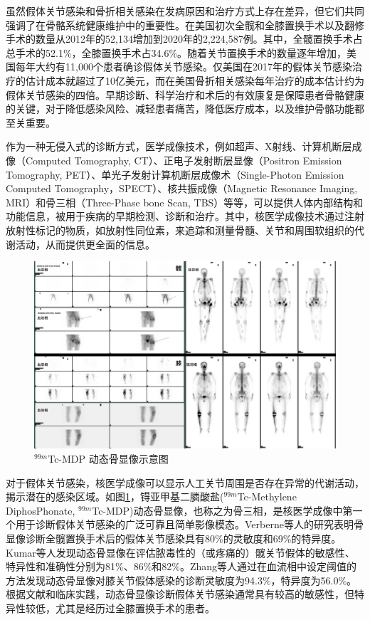 虽然假体关节感染和骨折相关感染在发病原因和治疗方式上存在差异，但它们共同强调了在骨骼系统健康维护中的重要性。在美国初次全髋和全膝置换手术以及翻修手术的数量从2012年的52,134增加到2020年的2,224,587例。其中，全髋置换手术占总手术的52.1\%，全膝置换手术占34.6\%\cite{AJRR2021}。随着关节置换手术的数量逐年增加，美国每年大约有11,000个患者确诊假体关节感染\cite{kamath2015quantifying}。仅美国在2017年的假体关节感染治疗的估计成本就超过了10亿美元\cite{premkumar2021projected}，而在美国骨折相关感染每年治疗的成本估计约为假体关节感染的四倍\cite{thakore2015surgical}。早期诊断、科学治疗和术后的有效康复是保障患者骨骼健康的关键，对于降低感染风险、减轻患者痛苦，降低医疗成本，以及维护骨骼功能都至关重要。

作为一种无侵入式的诊断方式，医学成像技术，例如超声、X射线、计算机断层成像（Computed Tomography, CT）、正电子发射断层显像（Positron Emission Tomography, PET）、单光子发射计算机断层成像术（Single-Photon Emission Computed Tomography，SPECT）、核共振成像（Magnetic Resonance Imaging, MRI）和骨三相（Three-Phase bone Scan, TBS）等等，可以提供人体内部结构和功能信息，被用于疾病的早期检测、诊断和治疗。其中，核医学成像技术通过注射放射性标记的物质，如放射性同位素，来追踪和测量骨髓、关节和周围软组织的代谢活动，从而提供更全面的信息。

\begin{figure}[ht]
  \centering
  \includegraphics[width=\textwidth]{figures/chap01_DBS.jpg}
  \caption{\(^{99m}\)Tc-MDP 动态骨显像示意图}
  \label{fig:chap01_DBS}
\end{figure}

对于假体关节感染，核医学成像可以显示人工关节周围是否存在异常的代谢活动，揭示潜在的感染区域。如图\ref{fig:chap01_DBS}，锝亚甲基二膦酸盐(\(^{99m}\)Tc-Methylene DiphosPhonate, \(^{99m}\)Tc-MDP)动态骨显像，也称之为骨三相，是核医学成像中第一个用于诊断假体关节感染的广泛可靠且简单影像模态\cite{niccoli2017bone}。Verberne等人\cite{verberne2016accuracy}的研究表明骨显像诊断全髋置换手术后的假体关节感染具有80\%的灵敏度和69\%的特异度。Kumar等人\cite{kumar2016comparative}发现动态骨显像在评估脓毒性的（或疼痛的）髋关节假体的敏感性、特异性和准确性分别为81\%、86\%和82\%。Zhang等人\cite{zhang2022temporal}通过在血流相中设定阈值的方法发现动态骨显像对膝关节假体感染的诊断灵敏度为94.3\%，特异度为56.0\%。根据文献和临床实践，动态骨显像诊断假体关节感染通常具有较高的敏感性，但特异性较低，尤其是经历过全膝置换手术的患者。

